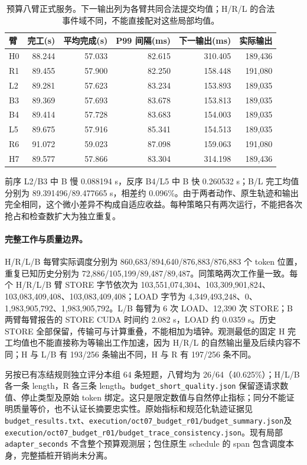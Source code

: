 \documentclass[UTF8,fontset=fandol,a4paper,10pt]{ctexart}
\newcommand{\code}[1]{\nolinkurl{#1}}
\begin{document}
\begin{table}[htbp]
\centering\small
\caption{预算八臂正式服务。下一输出列为各臂共同合法提交均值；H/R/L 的合法事件域不同，不能直接配对这些局部均值。}
\label{tab:budget-results}
\begin{tabular}{@{}lrrrrr@{}}
\toprule
臂 & 完工(s) & 平均完成(s) & P99 间隔(ms) & 下一输出(ms) & 实际输出 \\
\midrule
H0 & 88.244 & 57.033 & 82.615 & 310.405 & 189,436 \\
R1 & 89.455 & 57.900 & 82.250 & 158.448 & 191,080 \\
L2 & 89.281 & 57.623 & 83.234 & 153.893 & 189,035 \\
B3 & 89.369 & 57.693 & 83.678 & 153.813 & 189,035 \\
B4 & 89.414 & 57.728 & 83.683 & 154.003 & 189,035 \\
L5 & 89.675 & 57.916 & 85.341 & 154.513 & 189,035 \\
R6 & 91.072 & 59.023 & 87.098 & 159.063 & 191,080 \\
H7 & 89.577 & 57.866 & 83.304 & 314.198 & 189,436 \\
\bottomrule
\end{tabular}
\end{table}

前序 L2/B3 中 B 慢 0.088194 s，反序 B4/L5 中 B 快 0.260532 s；B/L 完工均值分别为 89.391496/89.477665 s，相差约 0.096\%。由于两者动作、原生轨迹和输出完全相同，这个微小差异不构成自适应收益。每种策略只有两次运行，不能把各次抢占和检查数扩大为独立重复。

\paragraph{完整工作与质量边界。}
H/R/L/B 每臂实际调度分别为 860,683/894,640/876,883/876,883 个 token 位置，重复已知历史分别为 72,886/105,199/89,487/89,487。同策略两次工作量一致。每个 H/R/L/B 臂 STORE 字节依次为 103,551,074,304、103,309,901,824、103,083,409,408、103,083,409,408；LOAD 字节为 4,349,493,248、0、1,983,905,792、1,983,905,792。L/B 每臂为 6 次 LOAD、12,390 次 STORE；B 两臂每臂报告的 STORE CUDA 时间约 2.082 s，LOAD 约 0.0359 s。历史 STORE 全部保留，传输可与计算重叠，不能相加为墙钟。观测最低的固定 H 完工均值也不能直接称为等输出工作加速，因为 H/R/L 的自然输出量及后续内容不同；H 与 L/B 有 193/256 条输出不同，H 与 R 有 197/256 条不同。

另按已有冻结规则独立评分本组 64 条短题，八臂均为 26/64（40.625\%）；H/L/B 各一条 length，R 各三条 length。\code{budget_short_quality.json} 保留逐请求数值、停止类型及原始 token 绑定。这只是限定数值与自然停止指标；同分不能证明质量等价，也不认证长摘要忠实性。原始指标和规范化轨迹证据见\code{budget_results.txt}、\code{execution/oct07_budget_r01/budget_summary.json}及\code{execution/oct07_budget_r01/budget_trace_consistency.json}。现有局部\code{adapter_seconds} 不含整个预算观测层；包住原生 schedule 的 span 包含调度本身，完整插桩开销尚未分离。
\end{document}
